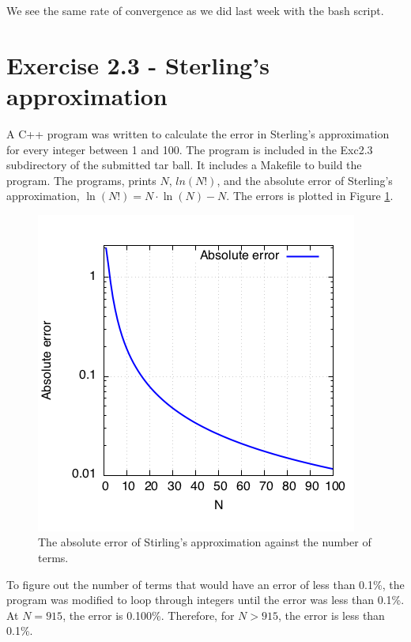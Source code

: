 \documentclass{article}
\begin{document}
  We see the same rate of convergence as we did last week with the bash script. 
  
  \section{Exercise 2.3 - Sterling's approximation}
  A C++ program was written to calculate the error in Sterling's approximation for every integer between 1 and 100. The program is included in the Exc2.3 subdirectory of the submitted tar ball. It includes a Makefile to build the program. The programs, prints $N$, $ln(N!)$, and the absolute error of Sterling's approximation, $\ln(N!)=N \cdot \ln(N) - N$. The errors is plotted in Figure \ref{fig:sterling}. 
  \begin{figure}[H]
  \begin{center}
  \includegraphics[scale=0.4]{Exc2.3/stirling_error.png}
  \caption{\small{The absolute error of Stirling's approximation against the number of terms.} }
 \label{fig:sterling}
  \end{center}
  \end{figure}
To figure out the number of terms that would have an error of less than 0.1\%, the program was modified to loop through integers until the error was less than 0.1\%. At $N=915$, the error is 0.100\%. Therefore, for $N>915$, the error is less than 0.1\%. 
\end{document}
